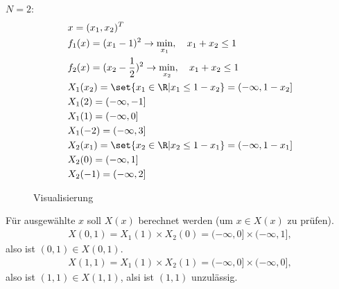 \begin{beispiel}\label{ex:4-1} %
  $N = 2$:
  \begin{align*}
&    x = (x_{1}, x_{2})^{T}\\
&f_{1}(x) = (x_{1} - 1)^{2} \to \min_{x_{1}}, \quad x_{1} + x_{2} \leq 1\\
&f_{2}(x) = (x_{2} - \frac 12)^{2} \to \min_{x_{2}}, \quad x_{1} + x_{2} \leq 1\\
&X_{1}(x_{2}) = \set{x_{1} \in \R| x_{1} \leq 1 - x_{2}} = (- \infty, 1 - x_{2}]\\
&X_{1}(2) = (- \infty, -1]\\
&X_{1}(1) = (- \infty, 0]\\
&X_{1}(-2) = (- \infty, 3]\\
&X_{2}(x_{1}) = \set{x_{2} \in \R| x_{2} \leq 1 - x_{1}} = (- \infty, 1 - x_{1}]\\
&X_{2}(0) = (-\infty, 1]\\
&X_{2}(-1) = (-\infty, 2]
  \end{align*}
  \begin{figure}[h!]
    \centering
    \caption{Visualisierung}
    \label{fig:ex_NEP}
  \end{figure}
Für ausgewählte $x$ soll $X(x)$ berechnet werden (um $x \in X(x)$ zu prüfen).
\begin{align*}
  X(0,1) = X_{1}(1) \times X_{2}(0) = (- \infty, 0] \times (- \infty, 1], 
\end{align*}
also ist $(0, 1) \in X(0, 1)$. 
\begin{align*}
    X(1,1) = X_{1}(1) \times X_{2}(1) = (- \infty, 0] \times (- \infty, 0], 
\end{align*}
also ist $(1, 1) \in X(1, 1)$, alsi ist $(1, 1)$ unzulässig. 
\end{beispiel}
